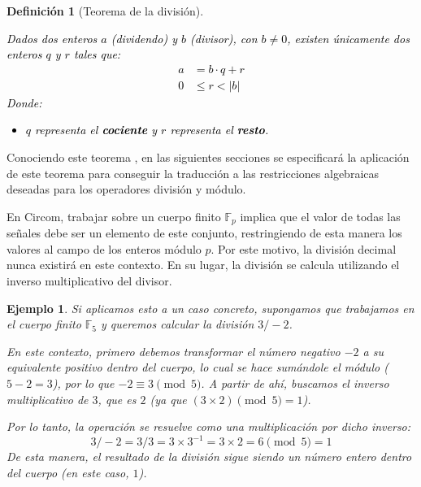 \documentclass[a4paper,12pt]{report}
\newtheorem{definicion}{Definición}
\newtheorem{ejemplo}{Ejemplo}
\begin{document}
	
	\begin{definicion}[Teorema de la división]
		\label{def:teo-div}
		\textcolor{black}{
			Dados dos enteros $a$ (dividendo) y $b$ (divisor), con $b \neq 0$, existen únicamente dos enteros $q$ y $r$ tales que:
			\begin{equation*} 
				\begin{aligned}
					a &= b \cdot q + r \\ 
					0 &\leq r < |b|
				\end{aligned}
			\end{equation*}
			Donde:
			\begin{itemize}
				\item $q$ representa el \textbf{cociente} y $r$ representa el \textbf{resto}.
			\end{itemize}
		}
	\end{definicion}
	
	\vspace{0.2cm}
	\noindent Conociendo este teorema \cite{studocu_division_entera}, en las siguientes secciones se especificará la aplicación de este teorema para conseguir la traducción a las restricciones algebraicas deseadas para los operadores división y módulo.
	
	\vspace{0.3cm}
	\noindent En Circom, trabajar sobre un cuerpo finito $\mathbb{F}_p$ implica que el valor de todas las señales debe ser un elemento de este conjunto, restringiendo de esta manera los valores al campo de los enteros módulo $p$. Por este motivo, la división decimal nunca existirá en este contexto. En su lugar, la división se calcula utilizando el inverso multiplicativo del divisor.
	
	\begin{ejemplo}
		
		\noindent Si aplicamos esto a un caso concreto, supongamos que trabajamos en el cuerpo finito $\mathbb{F}_5$ y queremos calcular la división $3 / -2$. 
		
		\vspace{0.3cm}
		\noindent
		En este contexto, primero debemos transformar el número negativo $-2$ a su equivalente positivo dentro del cuerpo, lo cual se hace sumándole el módulo ($5 - 2 = 3$), por lo que $-2 \equiv 3 \pmod 5$. A partir de ahí, buscamos el inverso multiplicativo de $3$, que es $2$ (ya que $(3 \times 2) \pmod 5 = 1$). 
		
		\vspace{0.3cm}
		\noindent
		Por lo tanto, la operación se resuelve como una multiplicación por dicho inverso:
		\[ 3 / -2 = 3 / 3 = 3 \times 3^{-1} = 3 \times 2 = 6 \pmod 5 = 1 \]
		De esta manera, el resultado de la división sigue siendo un número entero dentro del cuerpo (en este caso, $1$).
		
	\end{ejemplo} 
	
\end{document}
